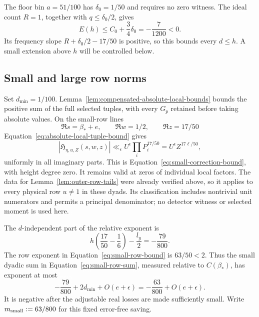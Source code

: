The floor bin \(a=51/100\) has \(\delta_0=1/50\) and requires no
zero witness.  The ideal count \(R=1\), together with
\(q\le\delta_0/2\), gives
\begin{equation}\label{eq:floor-bound}
 E(h)\le C_0+\frac34\delta_0=-\frac7{1200}<0.
\end{equation}
Its frequency slope \(R+\delta_0/2-17/50\) is positive, so this
bounds every \(d\le h\).  A small extension above \(h\) will be
controlled below.

\subsection{Small and large row norms}\label{sec:tails}

Set \(d_{\min}=1/100\).  Lemma~\ref{lem:compensated-absolute-local-bounds}
bounds the positive sum of the full selected tuples, with every \(G_p\)
retained before taking absolute values.  On the small-row lines
\[
 \Re s=\beta_*+e,\qquad \Re w=1/2,\qquad \Re z=17/50
\]
Equation~\eqref{eq:absolute-local-tuple-bound} gives
\[
 |\mathfrak H_{\eta,u,Z}(s,w,z)|
 \ll_\epsilon U^\epsilon\prod_iP_i^{17/50}
 =U^\epsilon Z^{17\ell/50},
\]
uniformly in all imaginary parts.  This is
Equation~\eqref{eq:small-correction-bound}, with height degree zero.
It remains valid at zeros of individual local factors.  The data for
Lemma~\ref{lem:outer-row-tails} were already verified above, so it
applies to every physical row \(u\ne1\) in these dyads.  Its
classification includes nontrivial unit numerators and permits a principal
denominator; no detector witness or selected moment is used here.

The \(d\)-independent part of the relative exponent is
\begin{equation}\label{eq:small-frequency-margin}
 h\left(\frac{17}{50}-\frac16\right)-\frac{l_y}{2}
 =-\frac{79}{800}.
\end{equation}
The row exponent in Equation~\eqref{eq:small-row-bound} is
\(63/50<2\).  Thus the small dyadic sum in
Equation~\eqref{eq:small-row-sum}, measured relative to \(C(\beta_*)\),
has exponent at most
\[
 -\frac{79}{800}+2d_{\min}+O(e+\epsilon)
 =-\frac{63}{800}+O(e+\epsilon).
\]
It is negative after the adjustable real losses are made sufficiently
small.  Write \(m_{\rm small}:=63/800\) for this fixed error-free saving.


